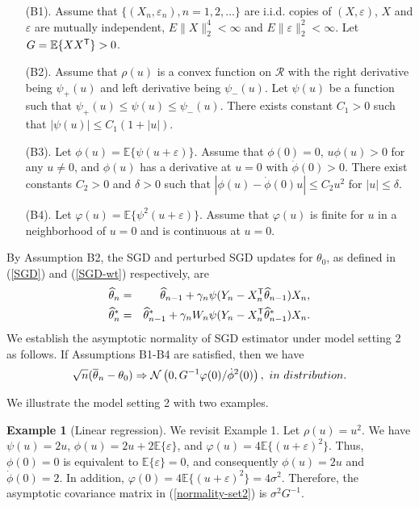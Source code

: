 \documentclass[12pt]{article}
\def\trans{^{\rm \textsf{T}}}
\def\wh{\widehat}
\def\ol{\overline}
\begin{document}
\begin{enumerate}
\item[(B1).] Assume that $\{(X_n,\varepsilon_n), n=1,2,...\}$  are i.i.d. copies of
$(X,\varepsilon)$, $X$ and $\varepsilon$ are mutually independent,   $E\|X\|^4_2<\infty$ and  $E\|\varepsilon\|_2^2<\infty$.  Let $G=\mathbb{E}\{XX\trans\}>0$.

\item[(B2).] Assume that $\rho(u)$ is a convex function on $\mathcal{R}$ with the right derivative being $\psi_+(u)$ and left derivative being $\psi_-(u)$. Let $\psi(u)$ be a function such that $\psi_+(u)\leq \psi(u) \leq \psi_-(u)$. There exists constant $C_1>0$ such that $|\psi(u)|\leq C_1(1+|u|)$.

\item[(B3).] Let $\phi(u)=\mathbb{E}\{\psi(u+\varepsilon)\}$. Assume that $\phi(0)=0$, $u\phi(u)>0$ for any $u\neq 0$, and $\phi(u)$ has a derivative at $u=0$ with $\dot{\phi}(0)>0$. There exist constants $C_2>0$ and $\delta>0$ such that $|\phi(u)-\dot{\phi}(0)u|\leq C_2u^2$ for $|u|\leq \delta$.

\item[(B4).] Let $\varphi(u)=\mathbb{E}\{\psi^2(u+\varepsilon)\}$. Assume that $\varphi(u)$ is finite for $u$ in a neighborhood of $u=0$ and is continuous at $u=0$.

\end{enumerate}

By Assumption B2, the SGD and perturbed SGD updates for $\theta_0$, as defined in (\ref{SGD}) and (\ref{SGD-wt}) respectively, are
\begin{eqnarray}
\wh{\theta}_n&=&\wh{\theta}_{n-1}+\gamma_n\psi(Y_n-X_n\trans\wh{\theta}_{n-1})X_n,\label{SGD-M}\\
\wh{\theta}^*_n&=&\wh{\theta}^*_{n-1}+\gamma_nW_n\psi(Y_n-X_n\trans\wh{\theta}^*_{n-1})X_n.\label{SGD-M-wt}
\end{eqnarray}
We establish the asymptotic normality of SGD estimator under model setting 2 as follows.
{\Lemma If Assumptions B1-B4 are satisfied, then we have
\begin{eqnarray}\label{normality-set2}
\sqrt{n}(\ol{\theta}_n-\theta_0) \Rightarrow \mathcal{N}\left(0, G^{-1}{\varphi(0)}/{\dot{\phi}^2(0)}\right), {\mbox \ in \ distribution.}
\end{eqnarray}}

We illustrate the model setting 2 with two examples.

{\bf Example 1} (Linear regression). We revisit  Example 1. Let $\rho(u)=u^2$. We have $\psi(u)=2u$, $\phi(u)=2u+2\mathbb{E}\{\varepsilon\}$, and $\varphi(u)=4\mathbb{E}\{(u+\varepsilon)^2\}$. Thus, $\phi(0)=0$ is equivalent to $\mathbb{E}\{\varepsilon\}=0$, and consequently $\phi(u)=2u$ and $\dot{\phi}(0)=2$. In addition, $\varphi(0)=4\mathbb{E}\{(u+\varepsilon)^2\}=4\sigma^2$. Therefore, the asymptotic covariance matrix in (\ref{normality-set2}) is $\sigma^2 G^{-1}$.
\end{document}
